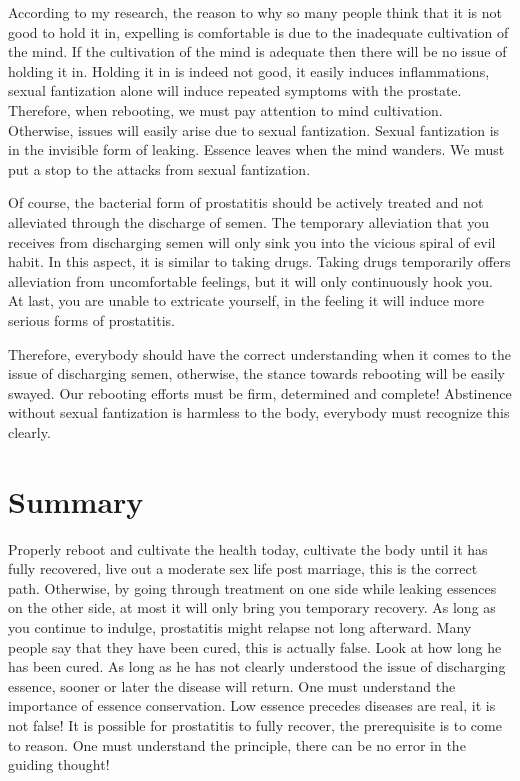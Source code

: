 \documentclass[
]{book}
\begin{document}
According to my research, the reason to why so many people think that it is not good to hold it in, expelling is comfortable is due to the inadequate cultivation of the mind. If the cultivation of the mind is adequate then there will be no issue of holding it in. Holding it in is indeed not good, it easily induces inflammations, sexual fantization alone will induce repeated symptoms with the prostate. Therefore, when rebooting, we must pay attention to mind cultivation. Otherwise, issues will easily arise due to sexual fantization. Sexual fantization is in the invisible form of leaking. Essence leaves when the mind wanders. We must put a stop to the attacks from sexual fantization.

Of course, the bacterial form of prostatitis should be actively treated and not alleviated through the discharge of semen. The temporary alleviation that you receives from discharging semen will only sink you into the vicious spiral of evil habit. In this aspect, it is similar to taking drugs. Taking drugs temporarily offers alleviation from uncomfortable feelings, but it will only continuously hook you. At last, you are unable to extricate yourself, in the feeling it will induce more serious forms of prostatitis.

Therefore, everybody should have the correct understanding when it comes to the issue of discharging semen, otherwise, the stance towards rebooting will be easily swayed. Our rebooting efforts must be firm, determined and complete! Abstinence without sexual fantization is harmless to the body, everybody must recognize this clearly.

\hypertarget{summary}{%
\section{Summary}\label{summary}}

Properly reboot and cultivate the health today, cultivate the body until it has fully recovered, live out a moderate sex life post marriage, this is the correct path. Otherwise, by going through treatment on one side while leaking essences on the other side, at most it will only bring you temporary recovery. As long as you continue to indulge, prostatitis might relapse not long afterward. Many people say that they have been cured, this is actually false. Look at how long he has been cured. As long as he has not clearly understood the issue of discharging essence, sooner or later the disease will return. One must understand the importance of essence conservation. Low essence precedes diseases are real, it is not false! It is possible for prostatitis to fully recover, the prerequisite is to come to reason. One must understand the principle, there can be no error in the guiding thought!
\end{document}

